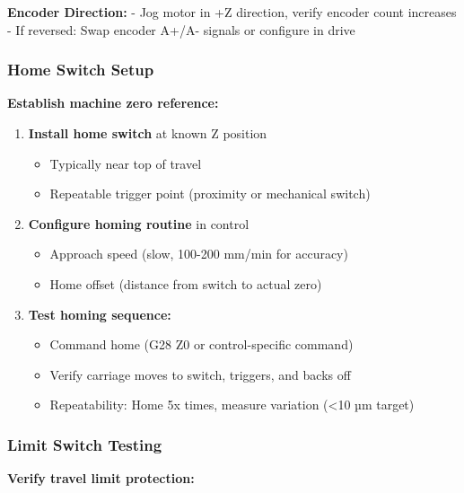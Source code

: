 \documentclass[
]{article}
\providecommand{\tightlist}{%
  \setlength{\itemsep}{0pt}\setlength{\parskip}{0pt}}
\begin{document}
\textbf{Encoder Direction:} - Jog motor in +Z direction, verify encoder
count increases - If reversed: Swap encoder A+/A- signals or configure
in drive

\subsubsection{Home Switch Setup}\label{home-switch-setup}

\textbf{Establish machine zero reference:}

\begin{enumerate}
\def\labelenumi{\arabic{enumi}.}
\tightlist
\item
  \textbf{Install home switch} at known Z position

  \begin{itemize}
  \tightlist
  \item
    Typically near top of travel
  \item
    Repeatable trigger point (proximity or mechanical switch)
  \end{itemize}
\item
  \textbf{Configure homing routine} in control

  \begin{itemize}
  \tightlist
  \item
    Approach speed (slow, 100-200 mm/min for accuracy)
  \item
    Home offset (distance from switch to actual zero)
  \end{itemize}
\item
  \textbf{Test homing sequence:}

  \begin{itemize}
  \tightlist
  \item
    Command home (G28 Z0 or control-specific command)
  \item
    Verify carriage moves to switch, triggers, and backs off
  \item
    Repeatability: Home 5x times, measure variation (\textless10 µm
    target)
  \end{itemize}
\end{enumerate}

\subsubsection{Limit Switch Testing}\label{limit-switch-testing}

\textbf{Verify travel limit protection:}
\end{document}
